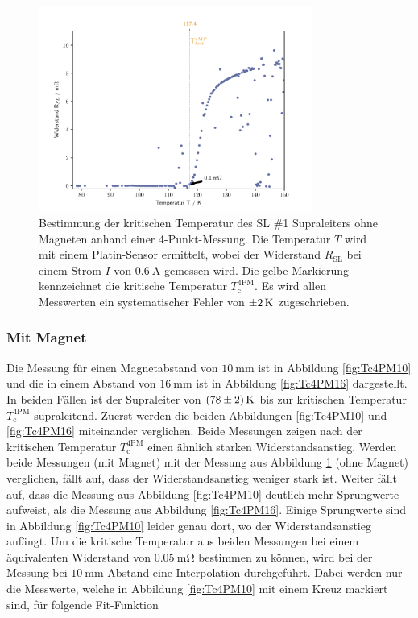 \begin{figure}[H]
    \centering
    \includegraphics[width=0.8\textwidth]{Auswertung/T_krit_Pt/R_T.pdf}
    \caption{Bestimmung der kritischen Temperatur des SL \#1 Supraleiters ohne Magneten
		anhand einer 4-Punkt-Messung. Die Temperatur $T$ wird mit einem Platin-Sensor
		ermittelt, wobei der Widerstand $R_{\text{SL}}$ bei einem Strom $I$ von $\SI{0.6}{\ampere}$
		gemessen wird. Die gelbe Markierung kennzeichnet die kritische Temperatur
		$T^{\text{4PM}}_{\text{c}}$. Es wird allen Messwerten ein systematischer
		Fehler von $\SI{\pm2}{\kelvin}$	zugeschrieben.}
    \label{fig:Tc4PM}
\end{figure}

\subsubsection{Mit Magnet}
\label{sec:mitB}
Die Messung für einen Magnetabstand von $\SI{10}{\milli\meter}$ ist in Abbildung
\ref{fig:Tc4PM10} und die in einem Abstand von $\SI{16}{\milli\meter}$ ist
in Abbildung \ref{fig:Tc4PM16} dargestellt. In beiden Fällen ist der Supraleiter
von $\SI{78\pm2}{\kelvin}$ bis zur kritischen Temperatur $T^{\text{4PM}}_{\text{c}}$ supraleitend.
Zuerst werden die beiden Abbildungen \ref{fig:Tc4PM10} und \ref{fig:Tc4PM16}
miteinander verglichen. Beide Messungen zeigen nach der kritischen
Temperatur $T^{\text{4PM}}_{\text{c}}$ einen ähnlich starken Widerstandsanstieg.
Werden beide Messungen (mit Magnet) mit der Messung aus Abbildung \ref{fig:Tc4PM}
(ohne Magnet) verglichen, fällt auf, dass der Widerstandsanstieg weniger stark ist.
Weiter fällt auf, dass die Messung aus Abbildung \ref{fig:Tc4PM10}
deutlich mehr Sprungwerte aufweist, als die Messung aus Abbildung \ref{fig:Tc4PM16}.
Einige Sprungwerte sind in Abbildung \ref{fig:Tc4PM10} leider genau dort, wo der
Widerstandsanstieg anfängt. Um die kritische Temperatur aus beiden Messungen
bei einem äquivalenten Widerstand von $\SI{0.05}{\milli\ohm}$ bestimmen zu können,
wird bei der Messung bei $\SI{10}{\milli\meter}$ Abstand eine Interpolation
durchgeführt.
\newpage
\noindent
Dabei werden nur die Messwerte, welche in Abbildung \ref{fig:Tc4PM10}
mit einem Kreuz markiert sind, für folgende Fit-Funktion

